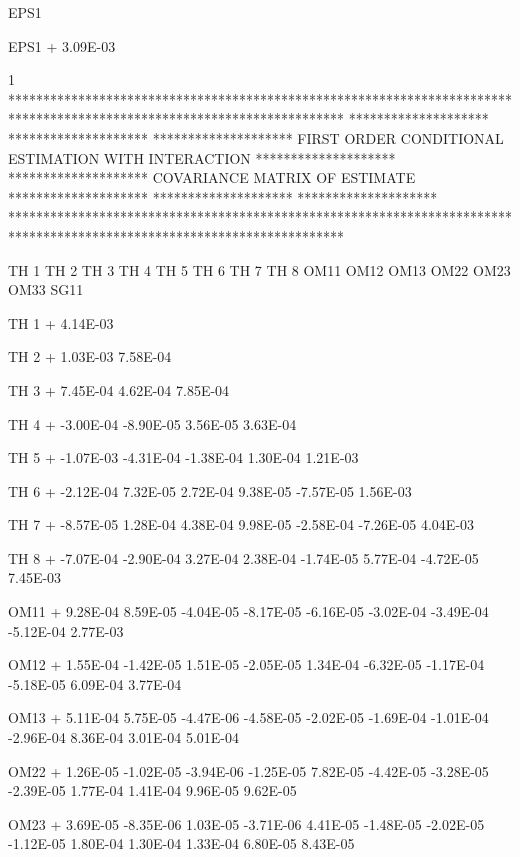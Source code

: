 \documentclass[
  letterpaper,
  toc=chapterentrywithdots,
  listof=totoc,
  11pt,
  headings=small,
  usegeometry]{scrreprt}
\begin{document}
\begin{nonmemlisting}
         EPS1     
 
 EPS1
+        3.09E-03
 
1
 ************************************************************************************************************************
 ********************                                                                                ********************
 ********************               FIRST ORDER CONDITIONAL ESTIMATION WITH INTERACTION              ********************
 ********************                          COVARIANCE MATRIX OF ESTIMATE                         ********************
 ********************                                                                                ********************
 ************************************************************************************************************************
 

            TH 1      TH 2      TH 3      TH 4      TH 5      TH 6      TH 7      TH 8      OM11      OM12      OM13      OM22  
             OM23      OM33      SG11  
 
 TH 1
+        4.14E-03
 
 TH 2
+        1.03E-03  7.58E-04
 
 TH 3
+        7.45E-04  4.62E-04  7.85E-04
 
 TH 4
+       -3.00E-04 -8.90E-05  3.56E-05  3.63E-04
 
 TH 5
+       -1.07E-03 -4.31E-04 -1.38E-04  1.30E-04  1.21E-03
 
 TH 6
+       -2.12E-04  7.32E-05  2.72E-04  9.38E-05 -7.57E-05  1.56E-03
 
 TH 7
+       -8.57E-05  1.28E-04  4.38E-04  9.98E-05 -2.58E-04 -7.26E-05  4.04E-03
 
 TH 8
+       -7.07E-04 -2.90E-04  3.27E-04  2.38E-04 -1.74E-05  5.77E-04 -4.72E-05  7.45E-03
 
 OM11
+        9.28E-04  8.59E-05 -4.04E-05 -8.17E-05 -6.16E-05 -3.02E-04 -3.49E-04 -5.12E-04  2.77E-03
 
 OM12
+        1.55E-04 -1.42E-05  1.51E-05 -2.05E-05  1.34E-04 -6.32E-05 -1.17E-04 -5.18E-05  6.09E-04  3.77E-04
 
 OM13
+        5.11E-04  5.75E-05 -4.47E-06 -4.58E-05 -2.02E-05 -1.69E-04 -1.01E-04 -2.96E-04  8.36E-04  3.01E-04  5.01E-04
 
 OM22
+        1.26E-05 -1.02E-05 -3.94E-06 -1.25E-05  7.82E-05 -4.42E-05 -3.28E-05 -2.39E-05  1.77E-04  1.41E-04  9.96E-05  9.62E-05
 
 OM23
+        3.69E-05 -8.35E-06  1.03E-05 -3.71E-06  4.41E-05 -1.48E-05 -2.02E-05 -1.12E-05  1.80E-04  1.30E-04  1.33E-04  6.80E-05
          8.43E-05
 

\end{nonmemlisting}
\end{document}
